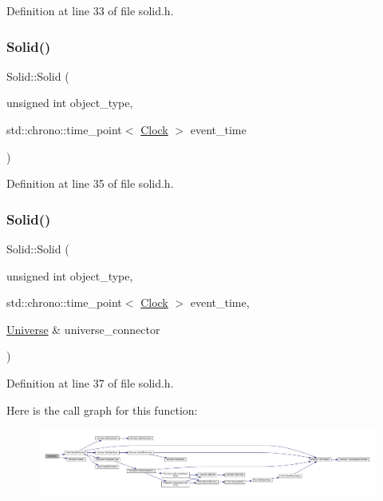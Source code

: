 Definition at line 33 of file solid.\+h.

\mbox{\label{class_solid_a9f5476b751c749af38b349b9fc7e2ba5}} 
\subsubsection{\texorpdfstring{Solid()}{Solid()}\hspace{0.1cm}{\footnotesize\ttfamily [3/4]}}
{\footnotesize\ttfamily Solid\+::\+Solid (\begin{DoxyParamCaption}\item[{unsigned int}]{object\+\_\+type,  }\item[{std\+::chrono\+::time\+\_\+point$<$ \hyperlink{universe_8h_a0ef8d951d1ca5ab3cfaf7ab4c7a6fd80}{Clock} $>$}]{event\+\_\+time }\end{DoxyParamCaption})\hspace{0.3cm}{\ttfamily [inline]}}



Definition at line 35 of file solid.\+h.

\mbox{\label{class_solid_a80746ad255dded6090e648fc3f0dbd93}} 
\subsubsection{\texorpdfstring{Solid()}{Solid()}\hspace{0.1cm}{\footnotesize\ttfamily [4/4]}}
{\footnotesize\ttfamily Solid\+::\+Solid (\begin{DoxyParamCaption}\item[{unsigned int}]{object\+\_\+type,  }\item[{std\+::chrono\+::time\+\_\+point$<$ \hyperlink{universe_8h_a0ef8d951d1ca5ab3cfaf7ab4c7a6fd80}{Clock} $>$}]{event\+\_\+time,  }\item[{\hyperlink{class_universe}{Universe} \&}]{universe\+\_\+connector }\end{DoxyParamCaption})\hspace{0.3cm}{\ttfamily [inline]}}



Definition at line 37 of file solid.\+h.

Here is the call graph for this function\+:
\nopagebreak
\begin{figure}[H]
\begin{center}
\leavevmode
\includegraphics[width=350pt]{class_solid_a80746ad255dded6090e648fc3f0dbd93_cgraph}
\end{center}
\end{figure}
\mbox{\label{class_solid_a07095e0808c0ef6b206bc70992ef557d}} 
